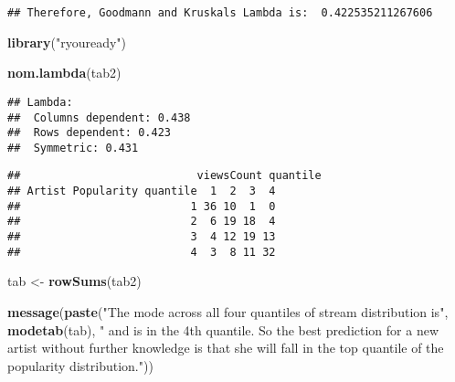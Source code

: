 \documentclass[
]{article}
\newenvironment{Shaded}{\begin{snugshade}}{\end{snugshade}}
\newcommand{\ControlFlowTok}[1]{\textcolor[rgb]{0.13,0.29,0.53}{\textbf{#1}}}
\newcommand{\DataTypeTok}[1]{\textcolor[rgb]{0.13,0.29,0.53}{#1}}
\newcommand{\DecValTok}[1]{\textcolor[rgb]{0.00,0.00,0.81}{#1}}
\newcommand{\KeywordTok}[1]{\textcolor[rgb]{0.13,0.29,0.53}{\textbf{#1}}}
\newcommand{\NormalTok}[1]{#1}
\newcommand{\OperatorTok}[1]{\textcolor[rgb]{0.81,0.36,0.00}{\textbf{#1}}}
\newcommand{\StringTok}[1]{\textcolor[rgb]{0.31,0.60,0.02}{#1}}
\begin{document}
\begin{verbatim}
## Therefore, Goodmann and Kruskals Lambda is:  0.422535211267606
\end{verbatim}

\begin{Shaded}
\begin{Highlighting}[]
\KeywordTok{library}\NormalTok{(}\StringTok{"ryouready"}\NormalTok{)}

\KeywordTok{nom.lambda}\NormalTok{(tab2)}
\end{Highlighting}
\end{Shaded}

\begin{verbatim}
## Lambda:
##  Columns dependent: 0.438 
##  Rows dependent: 0.423 
##  Symmetric: 0.431
\end{verbatim}

\begin{Shaded}
\end{Shaded}

\begin{verbatim}
##                           viewsCount quantile
## Artist Popularity quantile  1  2  3  4
##                          1 36 10  1  0
##                          2  6 19 18  4
##                          3  4 12 19 13
##                          4  3  8 11 32
\end{verbatim}

\begin{Shaded}
\begin{Highlighting}[]
\NormalTok{tab <-}\StringTok{ }\KeywordTok{rowSums}\NormalTok{(tab2)}

\KeywordTok{message}\NormalTok{(}\KeywordTok{paste}\NormalTok{(}\StringTok{"The mode across all four quantiles of stream distribution is"}\NormalTok{, }\KeywordTok{modetab}\NormalTok{(tab), }\StringTok{" and is in the 4th quantile. So the best prediction for a new artist without further knowledge is that she will fall in the top quantile of the popularity distribution."}\NormalTok{))}
\end{Highlighting}
\end{Shaded}
\end{document}
